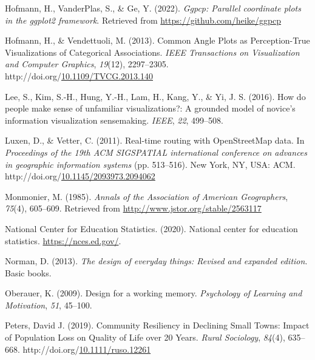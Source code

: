 \documentclass[print]{nuthesis}
\newlength{\cslhangindent}
\newenvironment{CSLReferences}[2]%
{\setlength{\parindent}{0pt}%
\everypar{\setlength{\hangindent}{\cslhangindent}}\ignorespaces}%
{\par}
\begin{document}
\begin{CSLReferences}{1}{0}
\leavevmode{}%
Hofmann, H., VanderPlas, S., \& Ge, Y. (2022). \emph{Ggpcp: Parallel coordinate plots in the ggplot2 framework}. Retrieved from \url{https://github.com/heike/ggpcp}

\leavevmode{}%
Hofmann, H., \& Vendettuoli, M. (2013). {Common Angle Plots as Perception-True Visualizations of Categorical Associations}. \emph{IEEE Transactions on Visualization and Computer Graphics}, \emph{19}(12), 2297--2305. http://doi.org/\href{https://doi.org/10.1109/TVCG.2013.140}{10.1109/TVCG.2013.140}

\leavevmode{}%
Lee, S., Kim, S.-H., Hung, Y.-H., Lam, H., Kang, Y., \& Yi, J. S. (2016). How do people make sense of unfamiliar visualizations?: A grounded model of novice's information visualization sensemaking. \emph{IEEE}, \emph{22}, 499--508.

\leavevmode{}%
Luxen, D., \& Vetter, C. (2011). Real-time routing with OpenStreetMap data. In \emph{Proceedings of the 19th ACM SIGSPATIAL international conference on advances in geographic information systems} (pp. 513--516). New York, NY, USA: ACM. http://doi.org/\href{https://doi.org/10.1145/2093973.2094062}{10.1145/2093973.2094062}

\leavevmode{}%
Monmonier, M. (1985). \emph{Annals of the Association of American Geographers}, \emph{75}(4), 605--609. Retrieved from \url{http://www.jstor.org/stable/2563117}

\leavevmode{}%
National Center for Education Statistics. (2020). National center for education statistics. \url{https://nces.ed.gov/}.

\leavevmode{}%
Norman, D. (2013). \emph{The design of everyday things: Revised and expanded edition}. Basic books.

\leavevmode{}%
Oberauer, K. (2009). Design for a working memory. \emph{Psychology of Learning and Motivation}, \emph{51}, 45--100.

\leavevmode{}%
Peters, David J. (2019). Community {Resiliency} in {Declining} {Small} {Towns}: {Impact} of {Population} {Loss} on {Quality} of {Life} over 20 {Years}. \emph{Rural Sociology}, \emph{84}(4), 635--668. http://doi.org/\href{https://doi.org/10.1111/ruso.12261}{10.1111/ruso.12261}


\end{CSLReferences}
\end{document}
